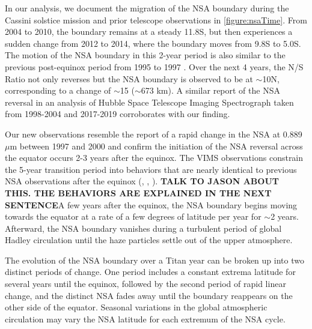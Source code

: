 \documentclass[apj,tighten]{emulateapj}
\begin{document}
In our analysis, we document the migration of the NSA boundary during the Cassini solstice mission and prior telescope observations in \autoref{figure:nsaTime}.
From 2004 to 2010, the boundary remains at a steady 11.8\degree{}S, but then experiences a sudden change from 2012 to 2014, where the boundary moves from 9.8\degree{}S to 5.0\degree{}S.
The motion of the NSA boundary in this 2-year period is also similar to the previous post-equinox period from 1995 to 1997 \citep{lorenz1999seasonal}.
Over the next 4 years, the N/S Ratio not only reverses but the NSA boundary is observed to be at $\sim$10\degree{}N, corresponding to a change of $\sim$15\degree{} ($\sim$673 km).
A similar report of the NSA reversal in an analysis of Hubble Space Telescope Imaging Spectrograph taken from 1998-2004 and 2017-2019 \citep{karkoschka2016seasonal,karkoschka2022titan} corroborates with our finding.

Our new observations resemble the report of a rapid change in the NSA at 0.889 $\mu$m between 1997 and 2000 \citep{lorenz2001titan} and confirm the initiation of the NSA reversal across the equator occurs 2-3 years after the equinox.
The VIMS observations constrain the 5-year transition period into behaviors that are nearly identical to previous NSA observations after the equinox (\cite{Sromovsky1981}, \cite{lorenz1999seasonal}, \cite{lorenz2001titan}).
\textbf{TALK TO JASON ABOUT THIS. THE BEHAVIORS ARE EXPLAINED IN THE NEXT SENTENCE}A few years after the equinox, the NSA boundary begins moving towards the equator at a rate of a few degrees of latitude per year for $\sim$2 years.
Afterward, the NSA boundary vanishes during a turbulent period of global Hadley circulation until the haze particles settle out of the upper atmosphere. 

The evolution of the NSA boundary over a Titan year can be broken up into two distinct periods of change.
One period includes a constant extrema latitude for several years until the equinox, followed by the second period of rapid linear change, and the distinct NSA fades away until the boundary reappears on the other side of the equator.
Seasonal variations in the global atmospheric circulation may vary the NSA latitude for each extremum of the NSA cycle. 
\end{document}
